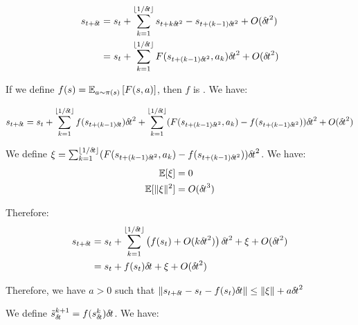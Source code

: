 
\begin{align}
  s_{t + {\delta\hspace{-.1em}t}} &= s_t + \sum_{k=1}^{\lfloor 1/{\delta\hspace{-.1em}t}\rfloor} s_{t+k{\delta\hspace{-.1em}t}^2} -  s_{t+(k-1){\delta\hspace{-.1em}t}^2} + O({\delta\hspace{-.1em}t}^2) \\
                    &= s_t + \sum_{k=1}^{\lfloor 1/{\delta\hspace{-.1em}t} \rfloor} F(s_{t+(k-1){\delta\hspace{-.1em}t}^2}, a_k){\delta\hspace{-.1em}t}^2 + O({\delta\hspace{-.1em}t}^2)
\end{align}

If we define $f(s) = \mathbb{E}_{a \sim \pi(s)}\left[F(s, a)\right]$, then $f$ is . We have: 

  \begin{align}
    s_{t + {\delta\hspace{-.1em}t}}   & = s_t + \sum_{k=1}^{\lfloor 1/{\delta\hspace{-.1em}t}\rfloor} f(s_{t+(k-1){\delta\hspace{-.1em}t}}){\delta\hspace{-.1em}t}^2 + \sum_{k=1}^{\lfloor 1/{\delta\hspace{-.1em}t}\rfloor} (F(s_{t+(k-1){\delta\hspace{-.1em}t}^2}, a_k) - f(s_{t+(k-1){\delta\hspace{-.1em}t}^2})){\delta\hspace{-.1em}t}^2 + O({\delta\hspace{-.1em}t}^2)        \\
  \end{align}

  We define $\xi = \sum_{k=1}^{\lfloor 1/{\delta\hspace{-.1em}t}\rfloor} (F(s_{t+(k-1){\delta\hspace{-.1em}t}^2}, a_k) - f(s_{t+(k-1){\delta\hspace{-.1em}t}^2})){\delta\hspace{-.1em}t}^2$. We have:
  \begin{align}
    \mathbb{E}[\xi] &= 0 \\
    \mathbb{E}[\|\xi\|^2] &= O({\delta\hspace{-.1em}t}^3)
  \end{align}

  Therefore:
  \begin{align}
  s_{t + {\delta\hspace{-.1em}t}}  &= s_t + \sum_{k=1}^{\lfloor 1/{\delta\hspace{-.1em}t}\rfloor} \left(f(s_{t}) + O(k{\delta\hspace{-.1em}t}^2)\right){\delta\hspace{-.1em}t}^2 + \xi + O({\delta\hspace{-.1em}t}^2) \\
                      & = s_t + f(s_{t}) {\delta\hspace{-.1em}t} + \xi + O({\delta\hspace{-.1em}t}^2) 
  \end{align}

  Therefore, we have $a>0$ such that $\|s_{t + {\delta\hspace{-.1em}t}} - s_t - f(s_t){\delta\hspace{-.1em}t}\| \leq \|\xi\| + a{\delta\hspace{-.1em}t}^2$
  
We define $\tilde s_{\delta\hspace{-.1em}t}^{k+1} = f(s_{\delta\hspace{-.1em}t}^k){\delta\hspace{-.1em}t}$. We have:

